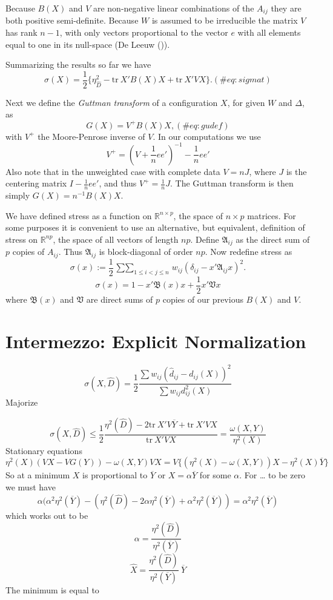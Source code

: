 \documentclass[
  12pt,
  letterpaper,
  DIV=11,
  numbers=noendperiod]{scrartcl}
\theoremstyle{plain}
\theoremstyle{remark}
\begin{document}
Because \(B(X)\) and \(V\) are non-negative linear combinations of the
\(A_{ij}\) they are both positive semi-definite. Because \(W\) is
assumed to be irreducible the matrix \(V\) has rank \(n-1\), with only
vectors proportional to the vector \(e\) with all elements equal to one
in its null-space (De Leeuw ()).

Summarizing the results so far we have \begin{equation}
\sigma(X)=\frac12\{\eta_{\hat D}^2-\text{tr}\ X'B(X)X+\text{tr}\ X'VX\}.
(\#eq:sigmat)
\end{equation}

Next we define the \emph{Guttman transform} of a configuration \(X\),
for given \(W\) and \(\Delta\), as \begin{equation}
G(X)=V^+B(X)X,
(\#eq:gudef)
\end{equation} with \(V^+\) the Moore-Penrose inverse of \(V\). In our
computations we use \begin{equation}
V^+=(V+\frac{1}{n}ee')^{-1}-\frac{1}{n}ee'
\end{equation} Also note that in the unweighted case with complete data
\(V=nJ\), where \(J\) is the centering matrix \(I-\frac{1}{n}ee'\), and
thus \(V^+=\frac{1}{n}J\). The Guttman transform is then simply
\(G(X)=n^{-1}B(X)X\).

We have defined stress as a function on \(\mathbb{R}^{n\times p}\), the
space of \(n\times p\) matrices. For some purposes it is convenient to
use an alternative, but equivalent, definition of stress on
\(\mathbb{R}^{np}\), the space of all vectors of length \(np\). Define
\(\mathfrak{A}_{ij}\) as the direct sum of \(p\) copies of \(A_{ij}\).
Thus \(\mathfrak{A}_{ij}\) is block-diagonal of order \(np\). Now
redefine stress as \[
\sigma(x):=\frac12\mathop{\sum\sum}_{1\leq i<j\leq n}w_{ij}(\delta_{ij}-x'\mathfrak{A}_{ij}x)^2.
\] \[
\sigma(x)=1-x'\mathfrak{B}(x)x+\frac12 x'\mathfrak{V}x
\] where \(\mathfrak{B}(x)\) and \(\mathfrak{V}\) are direct sums of
\(p\) copies of our previous \(B(X)\) and \(V\).

\section{Intermezzo: Explicit
Normalization}\label{intermezzo-explicit-normalization}

\[
\sigma(X,\hat D)=\frac12\frac{\sum w_{ij}(\hat d_{ij}-d_{ij}(X))^2}{\sum w_{ij}d_{ij}^2(X)}
\] Majorize

\[
\sigma(X,\hat D)\leq\frac12\frac{\eta^2(\hat D)-2\text{tr}\ X'V\overline{Y}+\text{tr}\ X'VX}{\text{tr}\ X'VX}=\frac{\omega(X,Y)}{\eta^2(X)}
\] Stationary equations \[
\eta^2(X)(VX-VG(Y))-\omega(X,Y)VX=V\{(\eta^2(X)-\omega(X,Y))X-\eta^2(X)\overline Y\}
\] So at a minimum \(X\) is proportional to \(\overline{Y}\) or
\(X=\alpha\overline{Y}\) for some \(\alpha\). For \ldots{} to be zero we
must have \[
\alpha(\alpha^2\eta^2(\overline Y)-(\eta^2(\hat D)-2\alpha\eta^2(\overline Y)+\alpha^2\eta^2(\overline Y))=\alpha^2\eta^2(\overline Y)
\] which works out to be \[
\alpha=\frac{\eta^2(\hat D)}{\eta^2(\overline Y)}
\] \[
\hat X=\frac{\eta^2(\hat D)}{\eta^2(\overline Y)}\ \overline{Y}
\] The minimum is equal to
\end{document}

